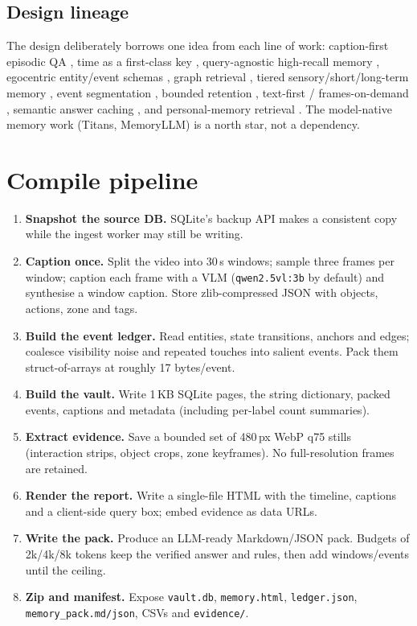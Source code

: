 \documentclass[10pt,a4paper]{article}
\newcommand{\code}[1]{\texttt{\small #1}}
\begin{document}
\subsection{Design lineage}

The design deliberately borrows one idea from each line of work: caption-first episodic QA
\cite{capmem}, time as a first-class key \cite{egocite}, query-agnostic high-recall memory
\cite{merit}, egocentric entity/event schemas \cite{egograph,vlkng,r4dsg}, graph retrieval
\cite{hipporag}, tiered sensory/short/long-term memory \cite{lightmem}, event segmentation
\cite{emllm}, bounded retention \cite{videomem}, text-first / frames-on-demand \cite{focusgraph,captiononce},
semantic answer caching \cite{semcache}, and personal-memory retrieval \cite{egomemory}. The
model-native memory work (Titans, MemoryLLM) \cite{titans,memoryllm} is a north star, not a
dependency.

\section{Compile pipeline}

\begin{enumerate}[leftmargin=1.35em,itemsep=1pt]
  \item \textbf{Snapshot the source DB.} SQLite's backup API makes a consistent copy while the
        ingest worker may still be writing.
  \item \textbf{Caption once.} Split the video into 30\,s windows; sample three frames per window;
        caption each frame with a VLM (\code{qwen2.5vl:3b} by default) and synthesise a window
        caption. Store zlib-compressed JSON with objects, actions, zone and tags.
  \item \textbf{Build the event ledger.} Read entities, state transitions, anchors and edges;
        coalesce visibility noise and repeated touches into salient events. Pack them
        struct-of-arrays at roughly 17 bytes/event.
  \item \textbf{Build the vault.} Write 1\,KB SQLite pages, the string dictionary, packed events,
        captions and metadata (including per-label count summaries).
  \item \textbf{Extract evidence.} Save a bounded set of 480\,px WebP q75 stills (interaction
        strips, object crops, zone keyframes). No full-resolution frames are retained.
  \item \textbf{Render the report.} Write a single-file HTML with the timeline, captions and a
        client-side query box; embed evidence as data URLs.
  \item \textbf{Write the pack.} Produce an LLM-ready Markdown/JSON pack. Budgets of 2k/4k/8k
        tokens keep the verified answer and rules, then add windows/events until the ceiling.
  \item \textbf{Zip and manifest.} Expose \code{vault.db}, \code{memory.html}, \code{ledger.json},
        \code{memory\_pack.md/json}, CSVs and \code{evidence/}.
\end{enumerate}
\end{document}
